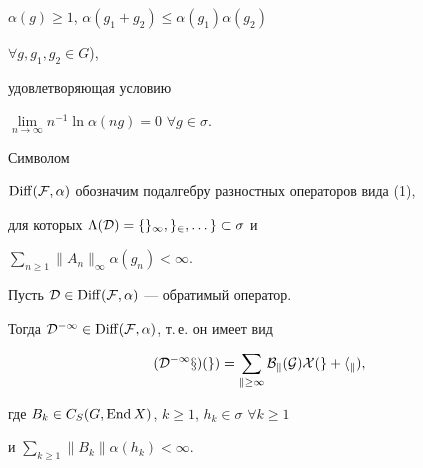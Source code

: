 $\alpha(g)\ge 1$, $\alpha(g_1+g_2)\le\alpha(g_1)\alpha(g_2)$ 


$\forall g,g_1,g_2\in G$), 


удовлетворяющая условию 


$\lim\limits_{n\to\infty}n^{-1}\ln\alpha(ng)=0$ $\forall g\in\sigma$. 


Символом 


$\operatorname{Diff}(\cal F,\alpha)$ обозначим подалгебру разностных операторов вида (1), 


для которых $\Lambda(\cal D)=\{g_1,g_2,\dotsc\}\subset\sigma$ и 


$\sum\limits_{n\ge 1}\|A_n\|_\infty\alpha(g_n)<\infty$. 


 


\begin{thm} Пусть $\cal D\in\operatorname{Diff}(\cal F,\alpha)$ --- обратимый оператор. 


Тогда $\cal D^{-1}\in\operatorname{Diff}(\cal F,\alpha)$, т.\,е. он имеет вид 


$$ 


(\cal D^{-1}x)(g)=\sum_{k\ge 1}B_k(G)X(g+h_k), 


$$ 


где $B_k\in C_S(G,\operatorname{End} X)$, $k\ge 1$, $h_k\in\sigma$ $\forall k\ge 1$ 


и $\sum\limits_{k\ge 1}\|B_k\|\alpha(h_k)<\infty$. 


\end{thm} 


 


